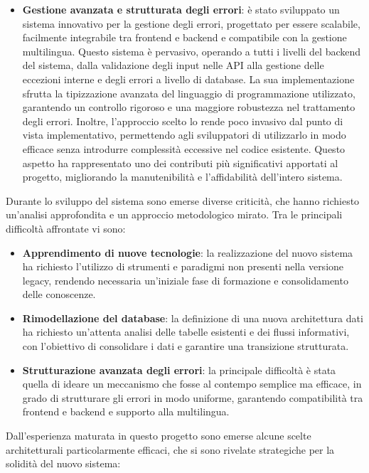 \begin{itemize}
  \item \textbf{Gestione avanzata e strutturata degli errori}: è stato sviluppato un sistema innovativo per la gestione degli errori, progettato per essere scalabile, facilmente integrabile tra frontend e backend e compatibile con la gestione multilingua. Questo sistema è pervasivo, operando a tutti i livelli del backend del sistema, dalla validazione degli input nelle API alla gestione delle eccezioni interne e degli errori a livello di database. La sua implementazione sfrutta la tipizzazione avanzata del linguaggio di programmazione utilizzato, garantendo un controllo rigoroso e una maggiore robustezza nel trattamento degli errori. Inoltre, l’approccio scelto lo rende poco invasivo dal punto di vista implementativo, permettendo agli sviluppatori di utilizzarlo in modo efficace senza introdurre complessità eccessive nel codice esistente. Questo aspetto ha rappresentato uno dei contributi più significativi apportati al progetto, migliorando la manutenibilità e l'affidabilità dell’intero sistema.
\end{itemize}

Durante lo sviluppo del sistema sono emerse diverse criticità, che hanno richiesto un'analisi approfondita e un approccio metodologico mirato. Tra le principali difficoltà affrontate vi sono:

\begin{itemize}
  \item \textbf{Apprendimento di nuove tecnologie}: la realizzazione del nuovo sistema ha richiesto l’utilizzo di strumenti e paradigmi non presenti nella versione legacy, rendendo necessaria un'iniziale fase di formazione e consolidamento delle conoscenze.
  \item \textbf{Rimodellazione del database}: la definizione di una nuova architettura dati ha richiesto un'attenta analisi delle tabelle esistenti e dei flussi informativi, con l'obiettivo di consolidare i dati e garantire una transizione strutturata.
  \item \textbf{Strutturazione avanzata degli errori}: la principale difficoltà è stata quella di ideare un meccanismo che fosse al contempo semplice ma efficace, in grado di strutturare gli errori in modo uniforme, garantendo compatibilità tra frontend e backend e supporto alla multilingua.
\end{itemize}

Dall’esperienza maturata in questo progetto sono emerse alcune scelte architetturali particolarmente efficaci, che si sono rivelate strategiche per la solidità del nuovo sistema:

